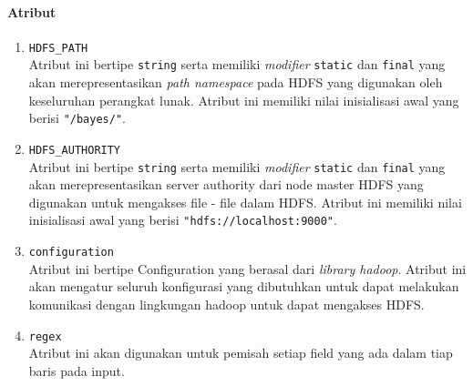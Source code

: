 	\paragraph{Atribut}
		\begin{enumerate}
			\item \verb|HDFS_PATH|\\
			Atribut ini bertipe \texttt{string} serta memiliki \textit{modifier} \texttt{static} dan \texttt{final} yang akan merepresentasikan \textit{path namespace} pada HDFS yang digunakan oleh keseluruhan perangkat lunak. Atribut ini memiliki nilai inisialisasi awal yang berisi \texttt{"/bayes/"}.

			\item \verb|HDFS_AUTHORITY|\\
			Atribut ini bertipe \texttt{string} serta memiliki \textit{modifier} \texttt{static} dan \texttt{final} yang akan merepresentasikan server authority dari node master HDFS yang digunakan untuk mengakses file - file dalam HDFS. Atribut ini memiliki nilai inisialisasi awal yang berisi \texttt{"hdfs://localhost:9000"}.

			\item \verb|configuration|\\
			Atribut ini bertipe Configuration yang berasal dari \textit{library hadoop}. Atribut ini akan mengatur seluruh konfigurasi yang dibutuhkan untuk dapat melakukan komunikasi dengan lingkungan hadoop untuk dapat mengakses HDFS.

			\item \verb|regex|\\
			Atribut ini akan digunakan untuk pemisah setiap field yang ada dalam tiap baris pada input.
			
		\end{enumerate}				

